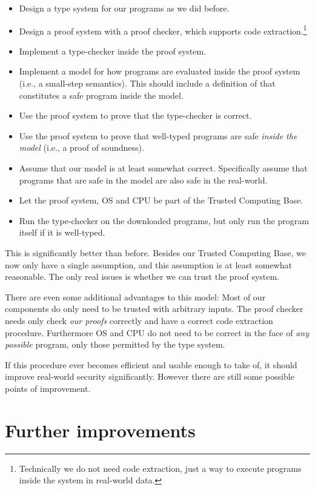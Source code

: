 \begin{itemize}
\item Design a type system for our programs as we did before.
\item Design a proof system with a proof checker, which supports code
  extraction.\footnote{Technically we do not need code extraction, just a way to
    execute programs inside the system in real-world data.}
\item Implement a type-checker inside the proof system.
\item Implement a model for how programs are evaluated inside the proof system
  (i.e., a small-step semantics). This should include a definition of that
  constitutes a safe program inside the model.
\item Use the proof system to prove that the type-checker is correct.
\item Use the proof system to prove that well-typed programs are safe
  \emph{inside the model} (i.e., a proof of soundness).
\item Assume that our model is at least somewhat correct. Specifically assume
  that programs that are safe in the model are also safe in the real-world.
\item Let the proof system, OS and CPU be part of the Trusted Computing Base.
\item Run the type-checker on the downloaded programs, but only run the program
  itself if it is well-typed.
\end{itemize}

This is significantly better than before. Besides our Trusted Computing Base, we
now only have a single assumption, and this assumption is at least somewhat
reasonable. The only real issues is whether we can trust the proof
system.

There are even some additional advantages to this model: Most of our components
do only need to be trusted with arbitrary inputs. The proof checker needs only
check \emph{our proofs} correctly and have a correct code extraction
procedure. Furthermore OS and CPU do not need to be correct in the face of
\emph{any possible} program, only those permitted by the type system.

If this procedure ever becomes efficient and usable enough to take of, it should
improve real-world security significantly. However there are still some possible
points of improvement.

\section{Further improvements}

